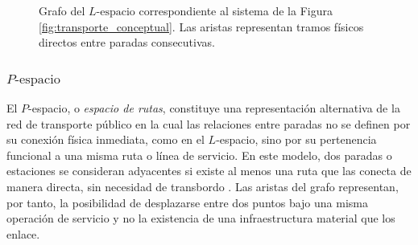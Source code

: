             \begin{figure}[H]
                \centering
                \caption{Grafo del $L\text{-espacio}$ correspondiente al sistema de la Figura \ref{fig:transporte_conceptual}. Las aristas representan tramos físicos directos entre paradas consecutivas.}
                \label{fig:l_espacio}
            \end{figure}

            \subsubsection{$P\text{-espacio}$}

                El $P$-espacio, o \textit{espacio de rutas}, constituye una representación alternativa de la red de transporte público en la cual las relaciones entre paradas no se definen por su conexión física inmediata, como en el $L$-espacio, sino por su pertenencia funcional a una misma ruta o línea de servicio. En este modelo, dos paradas o estaciones se consideran adyacentes si existe al menos una ruta que las conecta de manera directa, sin necesidad de transbordo \cite{dingluo2019}. Las aristas del grafo representan, por tanto, la posibilidad de desplazarse entre dos puntos bajo una misma operación de servicio y no la existencia de una infraestructura material que los enlace.

